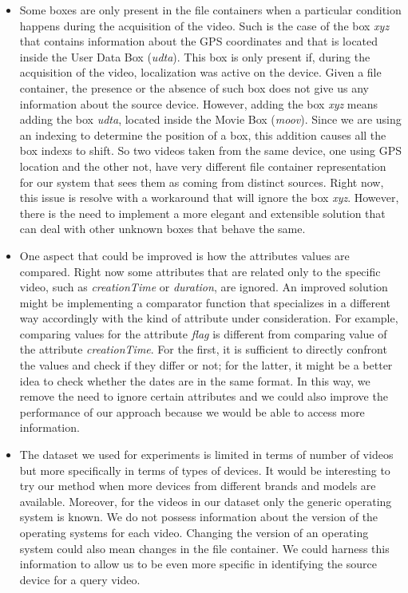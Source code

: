 \begin{itemize}

\item Some boxes are only present in the file containers when a particular condition happens during the acquisition of the video. Such is the case of the box \emph{xyz} that contains information about the GPS coordinates and that is located inside the User Data Box (\emph{udta}). This box is only present if, during the acquisition of the video, localization was active on the device. Given a file container, the presence or the absence of such box does not give us any information about the source device. However, adding the box \emph{xyz} means adding the box \emph{udta}, located inside the Movie Box (\emph{moov}). Since we are using an indexing to determine the position of a box, this addition causes all the box indexs to shift. So two videos taken from the same device, one using GPS location and the other not, have very different file container representation for our system that sees them as coming from distinct sources. Right now, this issue is resolve with a workaround that will ignore the box \emph{xyz}. However, there is the need to implement a more elegant and extensible solution that can deal with other unknown boxes that behave the same.

\item One aspect that could be improved is how the attributes values are compared. Right now some attributes that are related only to the specific video, such as \emph{creationTime} or \emph{duration}, are ignored. An improved solution might be implementing a comparator function that specializes in a different way accordingly with the kind of attribute under consideration. For example, comparing values for the attribute \emph{flag} is different from comparing value of the attribute \emph{creationTime}. For the first, it is sufficient to directly confront the values and check if they differ or not; for the latter, it might be a better idea to check whether the dates are in the same format. In this way, we remove the need to ignore certain attributes and we could also improve the performance of our approach because we would be able to access more information.

\item The dataset we used for experiments is limited in terms of number of videos but more specifically in terms of types of devices. It would be interesting to try our method when more devices from different brands and models are available. Moreover, for the videos in our dataset only the generic operating system is known. We do not possess information about the version of the operating systems for each video. Changing the version of an operating system could also mean changes in the file container. We could harness this information to allow us to be even more specific in identifying the source device for a query video.


\end{itemize}
